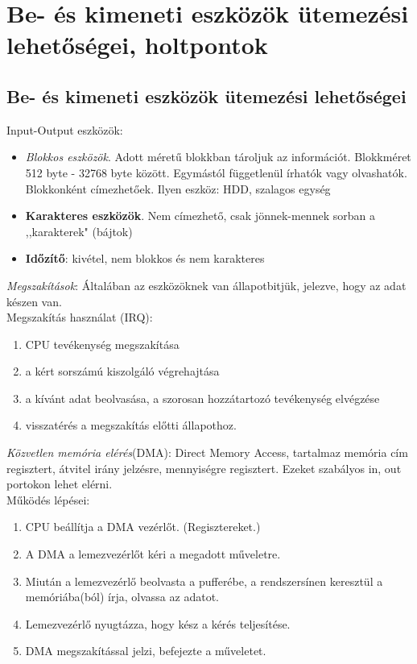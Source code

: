 \documentclass[margin=0px]{article}
\begin{document}
\section{Be- és kimeneti eszközök ütemezési lehetőségei, holtpontok}

\subsection{Be- és kimeneti eszközök ütemezési lehetőségei}

Input-Output eszközök:
\begin{itemize}
    \item \textit{Blokkos eszközök}. Adott méretű blokkban tároljuk az információt. Blokkméret 512 byte - 32768 byte között. Egymástól függetlenül írhatók vagy olvashatók. Blokkonként címezhetőek. Ilyen eszköz: HDD, szalagos egység
    \item \textbf{Karakteres eszközök}. Nem címezhető, csak jönnek-mennek sorban a
          ,,karakterek" (bájtok)
    \item \textbf{Időzítő}: kivétel, nem blokkos és nem
          karakteres
\end{itemize}
\textit{Megszakítások}: Általában az eszközöknek van állapotbitjük, jelezve, hogy az adat készen van. \\
Megszakítás használat (IRQ):
\begin{enumerate}
    \item CPU tevékenység megszakítása
    \item a kért sorszámú kiszolgáló végrehajtása
    \item a kívánt adat beolvasása, a szorosan hozzátartozó tevékenység elvégzése
    \item visszatérés a megszakítás előtti állapothoz.
\end{enumerate}
\textit{Közvetlen memória elérés}(DMA): Direct Memory Access, tartalmaz memória cím regisztert, átvitel irány jelzésre, mennyiségre regisztert. Ezeket szabályos in, out portokon lehet elérni. \\
Működés lépései:
\begin{enumerate}
    \item CPU beállítja a DMA vezérlőt. (Regisztereket.)
    \item A DMA a lemezvezérlőt kéri a megadott műveletre.
    \item Miután a lemezvezérlő beolvasta a pufferébe, a rendszersínen keresztül a memóriába(ból) írja, olvassa az adatot.
    \item Lemezvezérlő nyugtázza, hogy kész a kérés teljesítése.
    \item DMA megszakítással jelzi, befejezte a műveletet.
\end{enumerate}
\end{document}
